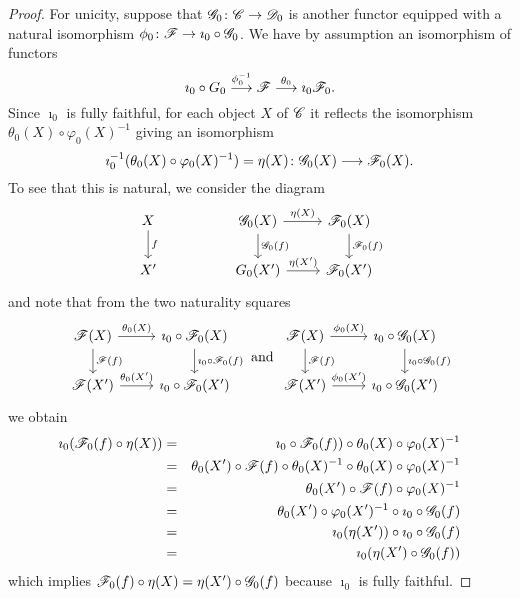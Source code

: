 \documentclass[10pt]{amsart}
\begin{document}
\begin{lem}
\begin{proof}
    For unicity, suppose that $\mathscr{G}_0 \colon \mathscr{C} \to \mathscr{D}_0$ is another functor equipped with a natural isomorphism $\phi_0 \colon \mathscr{F} \to \imath_0 \circ \mathscr{G}_0$.
    We have by assumption an isomorphism of functors
    $$\imath_0 \circ G_0 \overset{\phi_0^{-1}}\longrightarrow \mathscr{F} \overset{\theta_0}\longrightarrow \imath_0 \mathscr{F}_0.$$
    Since $\imath_0$ is fully faithful, for each object $X$ of $\mathscr{C}$ it reflects the isomorphism $\theta_0(X) \circ \varphi_0(X)^{-1}$ giving an isomorphism 
    $$\imath_0^{-1}(\theta_0(X) \circ \varphi_0(X)^{-1}) = \eta(X) \colon \mathscr{G}_0(X) \longrightarrow \mathscr{F}_0(X).$$
    To see that this is natural, we consider the diagram
    $$\begin{tikzcd}
      X\arrow{d}{f} & & \G_0(X) \arrow{d}{\G_0(f)}\arrow{r}{\eta(X)} & \F_0(X)\arrow{d}{\F_0(f)}\\
      X^\prime & & G_0(X^\prime) \arrow{r}{\eta(X^\prime)} & \F_0(X^\prime)
    \end{tikzcd}$$
    and note that from the two naturality squares
    $$\begin{tikzcd}
      \F(X) \arrow{d}{\F(f)}\arrow{r}{\theta_0(X)} & \imath_0 \circ \F_0(X)\arrow{d}{\imath_0 \circ \F_0(f)}\\
      \F(X^\prime) \arrow{r}{\theta_0(X^\prime)} & \imath_0 \circ \F_0(X^\prime)
    \end{tikzcd}
    \ \text{and}\ 
    \begin{tikzcd}
      \F(X) \arrow{d}{\F(f)}\arrow{r}{\phi_0(X)} & \imath_0 \circ \G_0(X)\arrow{d}{\imath_0 \circ \G_0(f)}\\
      \F(X^\prime) \arrow{r}{\phi_0(X^\prime)} & \imath_0 \circ \G_0(X^\prime)
    \end{tikzcd}$$
    we obtain
    \begin{eqnarray*}
      \imath_0(\mathscr{F}_0(f) \circ \eta(X)) &=& \imath_0 \circ \mathscr{F}_0(f)) \circ \theta_0(X) \circ \varphi_0(X)^{-1}\\
      &=& \theta_0(X^\prime) \circ \mathscr{F}(f) \circ \theta_0(X)^{-1} \circ \theta_0(X) \circ \varphi_0(X)^{-1}\\
      &=& \theta_0(X^\prime) \circ \mathscr{F}(f) \circ \varphi_0(X)^{-1}\\
      &=& \theta_0(X^\prime) \circ \varphi_0(X^\prime)^{-1} \circ \imath_0 \circ \mathscr{G}_0(f)\\
      &=& \imath_0(\eta(X^\prime)) \circ \imath_0 \circ \mathscr{G}_0(f)\\
      &=& \imath_0(\eta(X^\prime) \circ \mathscr{G}_0(f))
    \end{eqnarray*}
    which implies $\mathscr{F}_0(f) \circ \eta(X) = \eta(X^\prime) \circ \mathscr{G}_0(f)$ because $\imath_0$ is fully faithful.
  \end{proof}
\end{lem}
\end{document}

